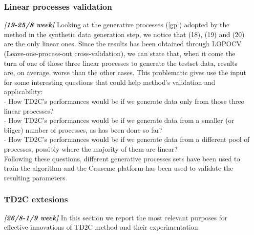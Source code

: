 \subsubsection{Linear processes validation} 
\textbf{\textit{[19-25/8 week]}} Looking at the generative processes (\ref{gp}) adopted by the method in the synthetic data generation step, we notice that (18), (19) and (20) are the only linear ones. 
Since the results has been obtained through LOPOCV (Leave-one-process-out cross-validation), we can state that, when it come the turn of one of those three linear processes to generate the testset data, results are, on average, worse than the other cases. This problematic gives use the input for some interesting questions that could help method's validation and applicability:\\
- How TD2C's performances would be if we generate data only from those three linear processes?\\
- How TD2C's performances would be if we generate data from a smaller (or biiger) number of processes, as has been done so far?\\
- How TD2C's performances would be if we generate data from a different pool of processes, possibly where the majority of them are linear?\\
Following these questions, different generative processes sets have been used to train the algorithm and the Causeme platform has been used to validate the resulting parameters.

\subsubsection{TD2C extesions}
\textbf{\textit{[26/8-1/9 week]}} In this section we report the most relevant purposes for effective innovations of TD2C method and their experimentation.\\

